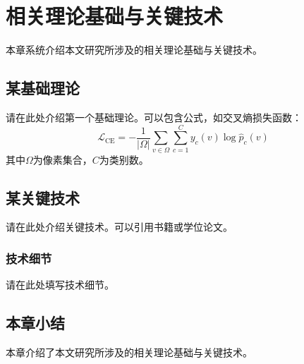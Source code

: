 
\chapter{相关理论基础与关键技术}\label{chap:preliminary}

本章系统介绍本文研究所涉及的相关理论基础与关键技术。

\section{某基础理论}\label{sec:theory-a}

请在此处介绍第一个基础理论。可以包含公式，如交叉熵损失函数：
\begin{equation}\label{eq:ce-loss}
  \mathcal{L}_{\text{CE}} = -\frac{1}{|\Omega|} \sum_{v \in \Omega} \sum_{c=1}^{C} y_c(v) \log \hat{p}_c(v)
\end{equation}
其中$\Omega$为像素集合，$C$为类别数。

\section{某关键技术}\label{sec:tech-a}

请在此处介绍关键技术。可以引用书籍\cite{lecun2015deeplearning}或学位论文\cite{zhao2019review}。

\subsection{技术细节}\label{subsec:tech-detail}

请在此处填写技术细节。

\section{本章小结}\label{sec:chap2-summary}

本章介绍了本文研究所涉及的相关理论基础与关键技术。

